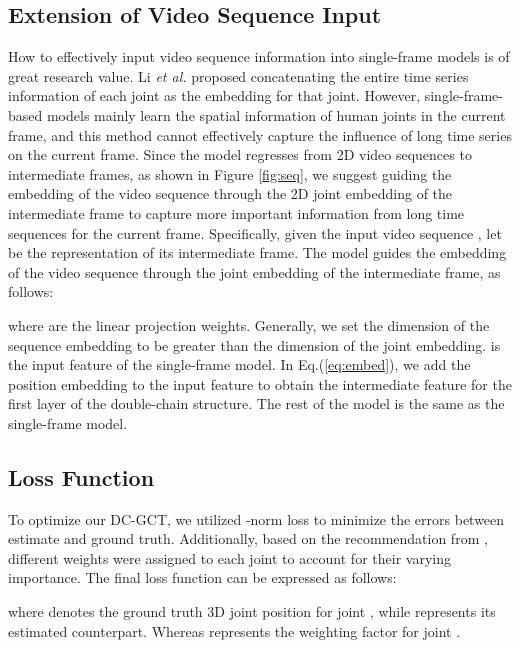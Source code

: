 \documentclass[journal]{IEEEtran}
\begin{document}
\subsection{Extension of Video Sequence Input}

How to effectively input video sequence information into single-frame models is of great research value. Li \textit{et al.} \cite{li2022graphmlp} proposed concatenating the entire time series information of each joint as the embedding for that joint. However, single-frame-based models mainly learn the spatial information of human joints in the current frame, and this method cannot effectively capture the influence of long time series on the current frame. Since the model regresses from 2D video sequences to intermediate frames, as shown in Figure \ref{fig:seq}, we suggest guiding the embedding of the video sequence through the 2D joint embedding of the intermediate frame to capture more important information from long time sequences for the current frame. Specifically, given the input video sequence , let  be the representation of its intermediate frame. The model guides the embedding of the video sequence through the joint embedding of the intermediate frame, as follows:

where  are the linear projection weights. Generally, we set the dimension  of the sequence embedding to be greater than the dimension  of the joint embedding.  is the input feature of the single-frame model. In Eq.(\ref{eq:embed}), we add the position embedding to the input feature  to obtain the intermediate feature  for the first layer of the double-chain structure. The rest of the model is the same as the single-frame model.



\subsection{Loss Function}

To optimize our DC-GCT, we utilized -norm loss to minimize the errors between estimate and ground truth. Additionally, based on the recommendation from \cite{zhang2022mixste}, different weights were assigned to each joint to account for their varying importance. The final loss function can be expressed as follows:

where  denotes the ground truth 3D joint position for joint , while  represents its estimated counterpart. Whereas  represents the weighting factor for joint .
\end{document}
